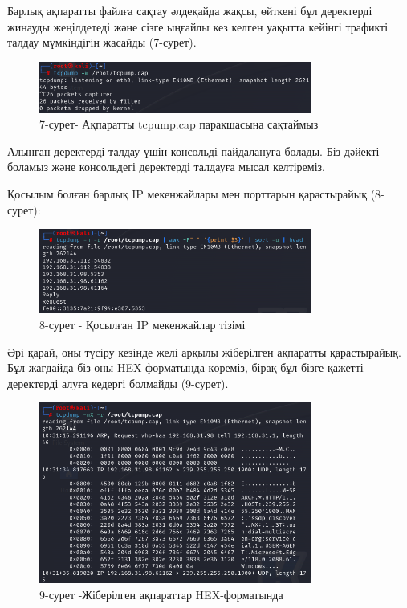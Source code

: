\begin{multicols}{2}
Барлық ақпаратты файлға сақтау әлдеқайда жақсы, өйткені бұл деректерді
жинауды жеңілдетеді және сізге ыңғайлы кез келген уақытта кейінгі
трафикті талдау мүмкіндігін жасайды (7-сурет).
\end{multicols}

\begin{figure}[H]
	\centering
	\includegraphics[width=0.8\textwidth]{assets/31}
	\caption*{7-сурет- Ақпаратты tcpump.cap парақшасына сақтаймыз}
\end{figure}

\begin{multicols}{2}
Алынған деректерді талдау үшін консольді пайдалануға болады. Біз дәйекті
боламыз және консольдегі деректерді талдауға мысал келтіреміз.

Қосылым болған барлық IP мекенжайлары мен порттарын қарастырайық
(8-сурет):
\end{multicols}

\begin{figure}[H]
	\centering
	\includegraphics[width=0.8\textwidth]{assets/32}
	\caption*{8-сурет - Қосылған IP мекенжайлар тізімі}
\end{figure}

\begin{multicols}{2}
Әрі қарай, оны түсіру кезінде желі арқылы жіберілген ақпаратты
қарастырайық. Бұл жағдайда біз оны HEX форматында көреміз, бірақ бұл
бізге қажетті деректерді алуға кедергі болмайды (9-сурет).
\end{multicols}

\begin{figure}[H]
	\centering
	\includegraphics[width=0.8\textwidth]{assets/33}
	\caption*{9-сурет -Жіберілген ақпараттар HEX-форматында}
\end{figure}

